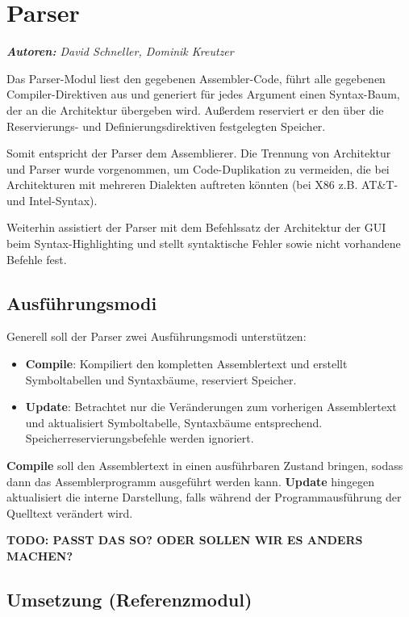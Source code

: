 \chapter{Parser}

\emph{\textbf{Autoren:} David Schneller, Dominik Kreutzer}

Das Parser-Modul liest den gegebenen Assembler-Code, führt alle gegebenen
Compiler-Direktiven aus und generiert für jedes Argument einen Syntax-Baum, der
an die Architektur übergeben wird.  Außerdem reserviert er den über die
Reservierungs- und Definierungsdirektiven festgelegten Speicher.

Somit entspricht der Parser dem Assemblierer.  Die Trennung von Architektur und
Parser wurde vorgenommen, um Code-Duplikation zu vermeiden, die bei
Architekturen mit mehreren Dialekten auftreten könnten (bei X86 z.B. AT\&T- und
Intel-Syntax).

Weiterhin assistiert der Parser mit dem Befehlssatz der Architektur der GUI beim
Syntax-Highlighting und stellt syntaktische Fehler sowie nicht vorhandene Befehle fest.

\section{Ausführungsmodi}

Generell soll der Parser zwei Ausführungsmodi unterstützen:
\begin{itemize}
\item \textbf{Compile}: Kompiliert den kompletten Assemblertext und erstellt Symboltabellen und Syntaxbäume, reserviert Speicher.
\item \textbf{Update}: Betrachtet nur die Veränderungen zum vorherigen Assemblertext und aktualisiert Symboltabelle, Syntaxbäume entsprechend. Speicherreservierungsbefehle werden ignoriert.
\end{itemize}

\textbf{Compile} soll den Assemblertext in einen ausführbaren Zustand bringen, sodass dann das Assemblerprogramm ausgeführt werden kann. \textbf{Update} hingegen aktualisiert die interne Darstellung, falls während der Programmausführung der Quelltext verändert wird.

\textbf{TODO: PASST DAS SO? ODER SOLLEN WIR ES ANDERS MACHEN?}

\section{Umsetzung (Referenzmodul)}

